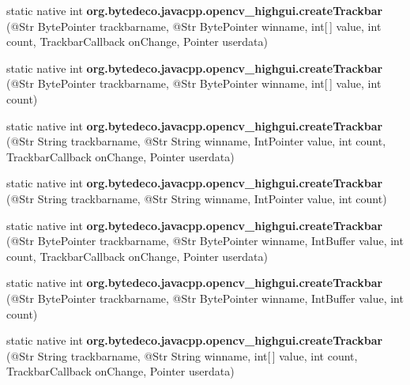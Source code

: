 \begin{DoxyCompactItemize}
\item 
\mbox{\label{group__highgui_gae273f460335ea0788cca879da6701d93}} 
static native int {\bfseries org.\+bytedeco.\+javacpp.\+opencv\+\_\+highgui.\+create\+Trackbar} (@Str Byte\+Pointer trackbarname, @Str Byte\+Pointer winname, int\mbox{[}$\,$\mbox{]} value, int count, Trackbar\+Callback on\+Change, Pointer userdata)
\item 
\mbox{\label{group__highgui_ga610bf1cdbaefe9bef6214cb5944e555f}} 
static native int {\bfseries org.\+bytedeco.\+javacpp.\+opencv\+\_\+highgui.\+create\+Trackbar} (@Str Byte\+Pointer trackbarname, @Str Byte\+Pointer winname, int\mbox{[}$\,$\mbox{]} value, int count)
\item 
\mbox{\label{group__highgui_ga8cf754e33b33d1b9c3d6ce02a7280875}} 
static native int {\bfseries org.\+bytedeco.\+javacpp.\+opencv\+\_\+highgui.\+create\+Trackbar} (@Str String trackbarname, @Str String winname, Int\+Pointer value, int count, Trackbar\+Callback on\+Change, Pointer userdata)
\item 
\mbox{\label{group__highgui_gae692304c8f86f9171895d0cf231d2a4a}} 
static native int {\bfseries org.\+bytedeco.\+javacpp.\+opencv\+\_\+highgui.\+create\+Trackbar} (@Str String trackbarname, @Str String winname, Int\+Pointer value, int count)
\item 
\mbox{\label{group__highgui_ga9bc22dafeea22e40e1c4581fd252af22}} 
static native int {\bfseries org.\+bytedeco.\+javacpp.\+opencv\+\_\+highgui.\+create\+Trackbar} (@Str Byte\+Pointer trackbarname, @Str Byte\+Pointer winname, Int\+Buffer value, int count, Trackbar\+Callback on\+Change, Pointer userdata)
\item 
\mbox{\label{group__highgui_ga6e1768545c8b966211db2d9c18cbc6f1}} 
static native int {\bfseries org.\+bytedeco.\+javacpp.\+opencv\+\_\+highgui.\+create\+Trackbar} (@Str Byte\+Pointer trackbarname, @Str Byte\+Pointer winname, Int\+Buffer value, int count)
\item 
\mbox{\label{group__highgui_ga89bc486d1fb5602ffab8beba664107ab}} 
static native int {\bfseries org.\+bytedeco.\+javacpp.\+opencv\+\_\+highgui.\+create\+Trackbar} (@Str String trackbarname, @Str String winname, int\mbox{[}$\,$\mbox{]} value, int count, Trackbar\+Callback on\+Change, Pointer userdata)

\end{DoxyCompactItemize}
